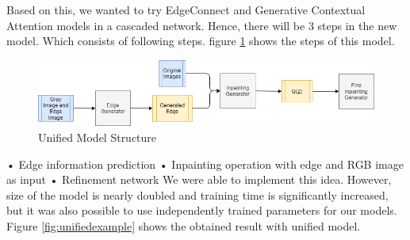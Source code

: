 Based on this, we wanted to try EdgeConnect and Generative Contextual Attention models in a cascaded network. Hence, there will be 3 steps in the new model. Which consists of following steps. figure \ref{fig:unifiedIdeda} shows the steps of this model. 


\begin{figure}[h!]
    \centering
    \includegraphics[scale=0.5]{figures/chapter5/Unified.png}
    \vspace*{3mm}
    \caption{Unified Model Structure }
    \label{fig:unifiedIdeda}
\end{figure}

•	Edge information prediction \newline
•	Inpainting operation with edge and RGB image as input \newline
•	Refinement network  \newline
We were able to implement this idea. However, size of the model is nearly doubled and training time is significantly increased, but it was also possible to use independently trained parameters for our models. Figure \ref{fig:unifiedexample} shows the obtained result with unified model.

